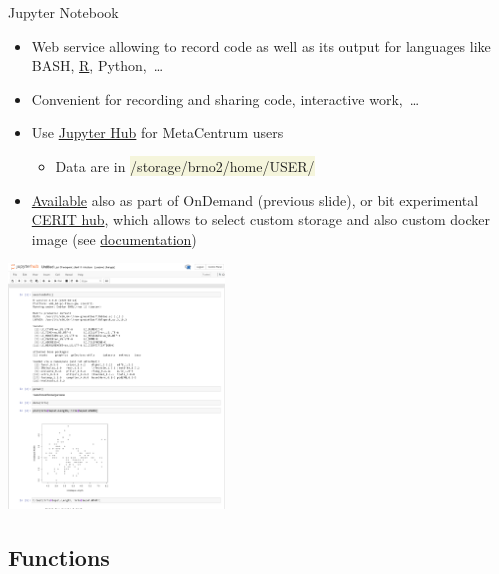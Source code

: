 \documentclass[compress, ucs, xelatex, 11pt, xcolor=svgnames, aspectratio=169,
	hyperref={
		bookmarks=true,
		unicode=true,
		colorlinks=true,
		pdftitle={Molecular data in R},
		plainpages=false,
		pdfauthor={Vojtech Zeisek},
		pdfsubject={Course about phylogeny and evolution in R},
		pdfcreator={XeLaTeX},
		pdfkeywords={R, evolution, phylogeny, molecular data},
		linkcolor=Crimson, %
		anchorcolor=Magenta, %
		citecolor=Magenta, %
		filecolor=Magenta, %
		menucolor=Magenta, %
		urlcolor=DodgerBlue, %
		pdftex},
	url={hyphens, lowtilde} %
	]{beamer}
\renewcommand{\texttt}[1]{\colorbox{Beige}{{\ttfamily #1}}}
\begin{document}
\begin{frame}{Jupyter Notebook}
	\begin{multicols}{2}
		\begin{itemize}
			\item Web service allowing to record code as well as its output for languages like BASH, \href{https://wiki.metacentrum.cz/wiki/Jupyter_for_MetaCentrum_users\#Adding_R_kernel}{R}, Python,~\ldots
			\item Convenient for recording and sharing code, interactive work,~\ldots
			\item Use \href{https://wiki.metacentrum.cz/wiki/Jupyter_for_MetaCentrum_users}{Jupyter Hub} for MetaCentrum users
			\begin{itemize}
				\item Data are in \texttt{/storage/brno2/home/USER/}
			\end{itemize}
			\item \href{https://wiki.metacentrum.cz/wiki/Jupyter_notebook}{Available} also as part of OnDemand (previous slide), or bit experimental \href{https://hub.cerit-sc.cz/}{CERIT hub}, which allows to select custom storage and also custom docker image (see \href{https://docs.cerit.io/docs/jupyterhub.html}{documentation})
		\end{itemize}
		\begin{center}
			\includegraphics[height=6.5cm]{jupyter.png}
		\end{center}
	\end{multicols}
\end{frame}

\subsection{Functions}
\end{document}
